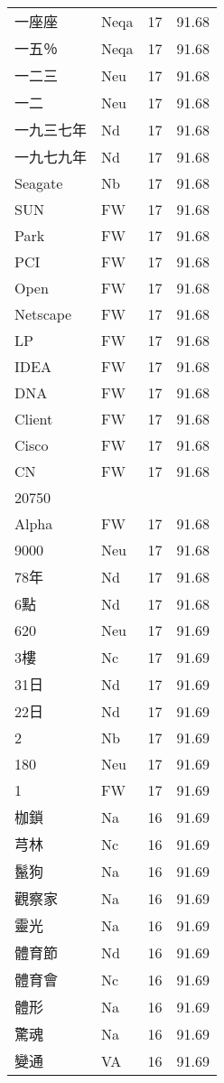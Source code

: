\documentclass[twocolumn]{book}
\begin{document}
\begin{supertabular}{llrr}
一座座 & Neqa & 17 &  91.68\\
一五％ & Neqa & 17 &  91.68\\
一二三 & Neu & 17 &  91.68\\
一二 & Neu & 17 &  91.68\\
一九三七年 & Nd & 17 &  91.68\\
一九七九年 & Nd & 17 &  91.68\\
Seagate & Nb & 17 &  91.68\\
SUN & FW & 17 &  91.68\\
Park & FW & 17 &  91.68\\
PCI & FW & 17 &  91.68\\
Open & FW & 17 &  91.68\\
Netscape & FW & 17 &  91.68\\
LP & FW & 17 &  91.68\\
IDEA & FW & 17 &  91.68\\
DNA & FW & 17 &  91.68\\
Client & FW & 17 &  91.68\\
Cisco & FW & 17 &  91.68\\
CN & FW & 17 &  91.68\\
20750\\
Alpha & FW & 17 &  91.68\\
9000 & Neu & 17 &  91.68\\
78年 & Nd & 17 &  91.68\\
6點 & Nd & 17 &  91.68\\
620 & Neu & 17 &  91.69\\
3樓 & Nc & 17 &  91.69\\
31日 & Nd & 17 &  91.69\\
22日 & Nd & 17 &  91.69\\
2 & Nb & 17 &  91.69\\
180 & Neu & 17 &  91.69\\
1 & FW & 17 &  91.69\\
枷鎖 & Na & 16 &  91.69\\
芎林 & Nc & 16 &  91.69\\
鬣狗 & Na & 16 &  91.69\\
觀察家 & Na & 16 &  91.69\\
靈光 & Na & 16 &  91.69\\
體育節 & Nd & 16 &  91.69\\
體育會 & Nc & 16 &  91.69\\
體形 & Na & 16 &  91.69\\
驚魂 & Na & 16 &  91.69\\
變通 & VA & 16 &  91.69\\

\end{supertabular}
\end{document}
